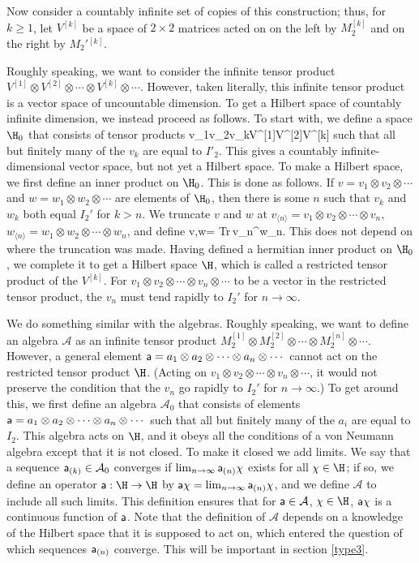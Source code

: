 \documentclass[12pt]{article}
\def\Tr{{\rm Tr}}
\def\a{{\sf a}}
\def\nn{{[n]}}
\def\kk{{[k]}}
\def\oone{{[1]}}
\def\ttwo{{[2]}}
\def\dn{{\la n\ra}}
\def\ra{\rangle}
\def\la{\langle}
\numberwithin{equation}{section}
\def\A{{\mathcal A}}
\begin{document}
Now consider a countably infinite set of copies of this construction; thus, for $k\geq 1$, let $V^\kk$ be a space of $2\times 2$
matrices acted on on the left by $M_2^\kk$ and on the right by $M_2'{}^\kk$.

Roughly speaking, we want to consider the infinite tensor product $V^\oone\otimes V^\ttwo \otimes \cdots\otimes V^\kk\otimes \cdots $.
However, taken literally, this infinite tensor product is a vector space of uncountable dimension.  To get a Hilbert space of
countably infinite dimension, we instead proceed as follows.  To start with, we define a space $\H_0$ that consists of tensor
products
\be\label{dofo}v_1\otimes v_2\otimes \cdots \otimes v_k\otimes \cdots \in V^\oone\otimes V^\ttwo \otimes \cdots \otimes V^\kk\otimes \cdots \ee
such that all but finitely many of the $v_k$ are equal to $I'_2$.  This gives a countably  infinite-dimensional
vector space, but not yet a Hilbert space.  To make a Hilbert space, we first define an inner product on $\H_0$.  This is done as follows.
If $v=v_1\otimes v_2\otimes \cdots$ and $w=w_1\otimes w_2\otimes \cdots$ are elements of $\H_0$, then there is some $n$
such that $v_k$ and $w_k$ both equal $I_2'$ for $k>n$.  We truncate $v$ and $w$ at $v_{\dn}=v_1\otimes v_2\otimes \cdots \otimes v_n$,
$w_\dn=w_1\otimes w_2\otimes \cdots \otimes w_n$, and define
\be\label{york}\la v,w\ra= \Tr\,v_\dn^\dagger w_\dn. \ee
This does not depend on where the truncation was made.
  Having defined a hermitian inner product on $\H_0$,
we complete it to get a Hilbert space $\H$, which is called a restricted tensor product of the $V^\kk$.  For
$v_1\otimes v_2\otimes \cdots \otimes v_n\otimes \cdots$ to be a vector in the restricted tensor product, the $v_n$ must
tend rapidly to $I_2'$ for $n\to\infty$.

We do something similar with the algebras.  Roughly speaking, we want to define an algebra $\A$ as an infinite tensor product
$M_2^\oone\otimes M_2^\ttwo \otimes \cdots\otimes M_2^\nn\otimes\cdots$.    However, a general element
${\a}=a_1\otimes a_2\otimes\cdots\otimes a_n\otimes\cdots  $ cannot act on the restricted tensor product $\H$.  (Acting on
$v_1\otimes v_2\otimes \cdots \otimes v_n\otimes \cdots$, it would not preserve the condition that the $v_n$ go rapidly to $I_2'$
for $n\to\infty$.)  To get around this, we first define an algebra $\A_0$ that consists of elements 
${\a}= a_1\otimes a_2\otimes\cdots\otimes a_n\otimes\cdots  $ such that all but finitely many of the $a_i$ are equal to $I_2$.  This
algebra acts on $\H$, and it obeys all the conditions of a von Neumann algebra except that it is not closed.  To make it closed
we add limits.  We say that a sequence ${\a}_{(k)}\in \A_0$ converges if 
$\lim_{n\to\infty} {\a}_{(n)}\chi$ exists for all $\chi\in \H$; if so, we define an operator $\a:\H\to \H$ by
${\a}\chi=\lim_{n\to\infty}{\a}_{(n)}\chi$, and we define $\A$ to include all such limits.  This definition ensures that
for $\a\in \A$, $\chi\in\H$, $\a\chi$ is a continuous function of $\a$.   Note that the definition of $\A$ depends
on a knowledge of the Hilbert space that it is supposed to act on, which entered the question of which sequences 
${\a}_{(n)}$ converge.
This will be important in section \ref{type3}.
\end{document}
